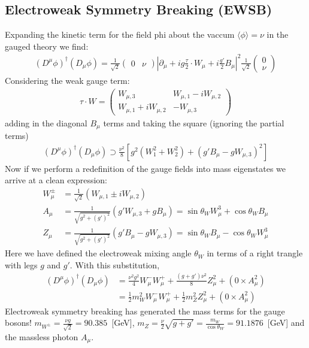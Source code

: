 \subsection{Electroweak Symmetry Breaking (EWSB)}

Expanding the kinetic term for the field phi about the vaccum $\langle \phi \rangle = \nu$ in the gauged theory we find:
\begin{align*}
(D^\mu \phi)^\dagger (D_\mu \phi) = \frac{1}{\sqrt{2}} \left (\begin{array}{cc} 0  & \nu \end{array} \right )  \left | \partial_\mu + i g \frac{\tau}{2} \cdot W_\mu + i \frac{g'}{2} B_\mu \right|^2  \frac{1}{\sqrt{2}} \left (\begin{array}{c} 0 \\ \nu \end{array} \right ) 
\end{align*}
Considering the weak gauge term:
\begin{align*}
\tau \cdot W  = \left (\begin{array}{cc} W_{\mu,3} & W_{\mu,1} - i W_{\mu,2}  \\ W_{\mu,1}+ i W_{\mu,2} & - W_{\mu,3} \end{array} \right )
\end{align*}
adding in the diagonal $B_\mu$ terms and taking the square (ignoring the partial terms) 
\begin{align*}
(D^\mu \phi)^\dagger (D_\mu \phi) \supset \frac{\nu^2}{8} \left [g^2 (W_1^2 + W_2^2) + (g' B_\mu - g W_{\mu,3})^2 \right]
\end{align*}
Now if we perform a redefinition of the gauge fields into mass eigenstates we arrive at a clean expression:
\begin{align*}
W_{\mu}^{\pm} &= \frac{1}{\sqrt{2}}( W_{\mu,1}  \pm i W_{\mu,2} )  \\
A_{\mu} &= \frac{1}{\sqrt{g^2 + (g')^2}} (g' W_{\mu,3} + g B_\mu) = \sin \theta_W W^3_\mu + \cos \theta_W B_\mu \\
Z_{\mu} &= \frac{1}{\sqrt{g^2 + (g')^2}}( g' B_\mu - g W_{\mu,3}) = \sin \theta_W B_\mu - \cos \theta_W W_\mu^3 
\end{align*}
Here we have defined the electroweak mixing angle $\theta_W$ in terms of a right trangle with legs $g$ and $g'$. With this substitution,
\begin{align*}
(D^\mu \phi)^\dagger (D_\mu \phi) &= \frac{\nu^2 g^2}{4} W_{\mu}^{-} W_{\mu}^{+} + \frac{(g+g')\nu^2}{8} Z_\mu^2  + (0 \times A_\mu^2) \\ 
&= \frac{1}{2} m_{W}^2 W_\mu^- W_\mu^+ + \frac{1}{2} m_Z^2 Z_\mu^2  + (0 \times A_\mu^2)
\end{align*}
Electroweak symmetry breaking has generated the mass terms for the gauge bosons! 
$m_{W^{\pm}} = \frac{\nu g}{\sqrt{2}} = 90.385$~[GeV],
 $m_Z = \frac{\nu}{2}\sqrt{g+g'} = \frac{m_W}{\cos \theta_W} = 91.1876$~[GeV]  and the massless photon $A_\mu$. 


